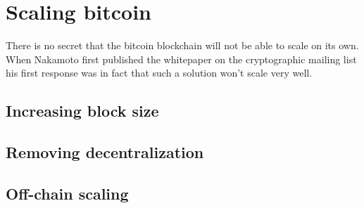 \chapter{Scaling bitcoin}

There is no secret that the bitcoin blockchain will not be able to scale on its own. When Nakamoto first published the whitepaper on the cryptographic mailing list his first response was in fact that such a solution won't scale very well\cite{donald:scale}.

\section{Increasing block size}

\section{Removing decentralization}

\section{Off-chain scaling}
